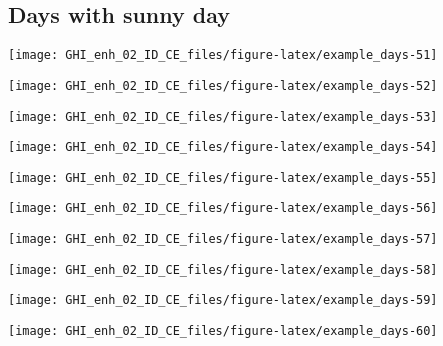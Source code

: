 \documentclass[
  10pt,
  a4paper,oneside]{article}
\begin{document}
\FloatBarrier

\hypertarget{days-with-sunny-day}{%
\subsection{Days with sunny day}\label{days-with-sunny-day}}

\begin{center}\texttt{[image: GHI\_enh\_02\_ID\_CE\_files/figure-latex/example\_days-51]} \end{center}

\begin{center}\texttt{[image: GHI\_enh\_02\_ID\_CE\_files/figure-latex/example\_days-52]} \end{center}

\begin{center}\texttt{[image: GHI\_enh\_02\_ID\_CE\_files/figure-latex/example\_days-53]} \end{center}

\begin{center}\texttt{[image: GHI\_enh\_02\_ID\_CE\_files/figure-latex/example\_days-54]} \end{center}

\begin{center}\texttt{[image: GHI\_enh\_02\_ID\_CE\_files/figure-latex/example\_days-55]} \end{center}

\begin{center}\texttt{[image: GHI\_enh\_02\_ID\_CE\_files/figure-latex/example\_days-56]} \end{center}

\begin{center}\texttt{[image: GHI\_enh\_02\_ID\_CE\_files/figure-latex/example\_days-57]} \end{center}

\begin{center}\texttt{[image: GHI\_enh\_02\_ID\_CE\_files/figure-latex/example\_days-58]} \end{center}

\begin{center}\texttt{[image: GHI\_enh\_02\_ID\_CE\_files/figure-latex/example\_days-59]} \end{center}

\begin{center}\texttt{[image: GHI\_enh\_02\_ID\_CE\_files/figure-latex/example\_days-60]} \end{center}
\end{document}
